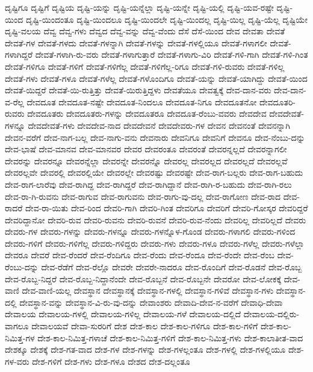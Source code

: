 {ದೃಷ್ಟಿಗೂ
ದೃಷ್ಟಿಗೆ
ದೃಷ್ಟಿಯ
ದೃಷ್ಟಿ-ಯನ್ನು
ದೃಷ್ಟಿ-ಯನ್ನೆಲ್ಲಾ
ದೃಷ್ಟಿ-ಯನ್ನೇ
ದೃಷ್ಟಿ-ಯಲ್ಲಿ
ದೃಷ್ಟಿ-ಯವ-ರಷ್ಟೇ
ದೃಷ್ಟಿ-ಯಿಂದ
ದೃಷ್ಟಿ-ಯಿಂದಂತೂ
ದೃಷ್ಟಿ-ಯಿಂದಲೂ
ದೃಷ್ಟಿ-ಯಿಂದಲೇ
ದೃಷ್ಟಿ-ಯಿಂದಲ್ಲ
ದೃಷ್ಟಿ-ಯಿಲ್ಲ
ದೃಷ್ಟಿ-ಯೆಲ್ಲ
ದೃಷ್ಟಿಯೇ
ದೃಷ್ಟಿ-ವಲಯ
ದೆವ್ವ
ದೆವ್ವ-ಗಳು
ದೆವ್ವದ
ದೆವ್ವ-ವನ್ನು
ದೆವ್ವ-ವೆಂದು
ದೆಸೆ
ದೆಸೆ-ಯಿಂದ
ದೇವ
ದೇವತಾ
ದೇವತೆ
ದೇವತೆ-ಗಳ
ದೇವತೆ-ಗಳದು
ದೇವತೆ-ಗಳನ್ನಾಗಿ
ದೇವತೆ-ಗಳನ್ನು
ದೇವತೆ-ಗಳಲ್ಲಿಯೂ
ದೇವತೆ-ಗಳಾಗಲೀ
ದೇವತೆ-ಗಳಾಗಿದ್ದರೆ
ದೇವತೆ-ಗಳಾಗಿ-ರು-ವರು
ದೇವತೆ-ಗಳಾಗುತ್ತಾರೆ
ದೇವತೆ-ಗಳಾಗು-ವಿರಿ
ದೇವತೆ-ಗಳಿ-ಗಾಗಿ
ದೇವತೆ-ಗಳಿ-ಗಿಂತ
ದೇವತೆ-ಗಳಿಗೂ
ದೇವತೆ-ಗಳಿಗೆ
ದೇವತೆ-ಗಳಿಗೆಲ್ಲ
ದೇವತೆ-ಗಳಿಗೆಲ್ಲ-ರಿಗೂ
ದೇವತೆ-ಗಳಿ-ರುವರು
ದೇವತೆ-ಗಳಿಲ್ಲ
ದೇವತೆ-ಗಳು
ದೇವತೆ-ಗಳೂ
ದೇವತೆ-ಗಳೆಲ್ಲ
ದೇವತೆ-ಗಳೊಂದಿಗೂ
ದೇವತೆ-ಯನ್ನು
ದೇವತೆ-ಯಾಗಿದ್ದು
ದೇವತೆ-ಯಿಂದ
ದೇವತೆ-ಯಿದ್ದರೆ
ದೇವತೆ-ಯಿ-ರುತ್ತಿತ್ತು
ದೇವತೆ-ಯಿರುತ್ತಿದ್ದಳು
ದೇವತೆಯೂ
ದೇವತ್ವಕ್ಕೆ
ದೇವ-ದಾನ-ವರು
ದೇವ-ದಾನ-ವ-ರೆಲ್ಲ
ದೇವದೂತ
ದೇವದೂತ-ನಷ್ಟೇ
ದೇವದೂತ-ನಿಂದಲೂ
ದೇವದೂತ-ನಿಗೂ
ದೇವದೂತನೋ
ದೇವದೂತರಿ-ರುವರು
ದೇವದೂತರು
ದೇವದೂತರು-ಗಳನ್ನು
ದೇವದೂತರೂ
ದೇವದೂತ-ರೆಂಬು-ವವರು
ದೇವದೇವ
ದೇವದೇವತೆ-ಗಳನ್ನೂ
ದೇವದೇವತೆ-ಗಳು
ದೇವದೇವ-ನಾದ
ದೇವದೇವನೆ
ದೇವದೇವರು-ಗಳ
ದೇವನ
ದೇವನಂತೆ
ದೇವನನ್ನಾಗಿ
ದೇವನ-ವರೆಗೆ
ದೇವ-ನಾಗ-ಬಲ್ಲ
ದೇವ-ನಾಗು-ವನು
ದೇವನಾರು
ದೇವನಿಗೂ
ದೇವನಿಗೆ
ದೇವನೂ
ದೇವ-ನೆಂಬು-ದನ್ನು
ದೇವ-ಭಾಷೆ
ದೇವ-ಮಾನವ
ದೇವ-ಮಾನವರ
ದೇವರ
ದೇವರಂತೂ
ದೇವರಂತೆ
ದೇವರನ್ನಲ್ಲದೆ
ದೇವರನ್ನಾಗಲೀ
ದೇವರನ್ನು
ದೇವರನ್ನೂ
ದೇವರನ್ನೆಲ್ಲಾ
ದೇವರನ್ನೇ
ದೇವರನ್ನೊ
ದೇವರಲ್ಲ
ದೇವರಲ್ಲದ
ದೇವರಲ್ಲದೆ
ದೇವರಲ್ಲವೆ
ದೇವರಲ್ಲವೇ
ದೇವರಲ್ಲಿ
ದೇವರಲ್ಲಿಯೇ
ದೇವರಲ್ಲೇ
ದೇವರಷ್ಟು
ದೇವರಷ್ಟೇ
ದೇವ-ರಾಗ-ಬಲ್ಲರು
ದೇವ-ರಾಗ-ಬಹುದು
ದೇವ-ರಾಗ-ಲಾರೆವು
ದೇವ-ರಾಗಿದ್ದ
ದೇವ-ರಾಗಿದ್ದರೆ
ದೇವ-ರಾಗಿದ್ದಾನೆ
ದೇವ-ರಾಗಿ-ರ-ಬಹುದು
ದೇವ-ರಾಗಿ-ರಲು
ದೇವ-ರಾ-ಗಿ-ರುವನು
ದೇವ-ರಾಗುವ
ದೇವ-ರಾಗುವನು
ದೇವ-ರಾಗು-ವು-ದಲ್ಲ
ದೇವ-ರಾಗೋಣ
ದೇವ-ರಾದ
ದೇವ-ರಾದರೆ
ದೇವ-ರಾ-ಯಿತು
ದೇವ-ರಿಂದ
ದೇವರಿ-ಗಾಗಿ
ದೇವರಿ-ಗಿಂತ
ದೇವರಿಗೂ
ದೇವರಿಗೆ
ದೇವರಿ-ಗೋಸ್ಕರ
ದೇವರಿದ್ದರೆ
ದೇವರಿದ್ದಾನೋ
ದೇವರಿ-ರುವ
ದೇವರಿ-ರುವನು
ದೇವರಿ-ರುವನೆ
ದೇವರಿ-ರುವ-ನೆಂದು
ದೇವರಿಲ್ಲ
ದೇವರಿಲ್ಲದೆ
ದೇವರು
ದೇವರು-ಗಳ
ದೇವರು-ಗಳನ್ನು
ದೇವರು-ಗಳನ್ನೂ
ದೇವರು-ಗಳನ್ನೊಳ-ಗೊಂಡ
ದೇವರು-ಗಳಾಗಲಿ
ದೇವರು-ಗಳಿಂದ
ದೇವರು-ಗಳಿಗೆ
ದೇವರು-ಗಳಿಗೆಲ್ಲ
ದೇವರು-ಗಳಿದ್ದರು
ದೇವರು-ಗಳು
ದೇವರು-ಗಳೂ
ದೇವರು-ಗಳೆಲ್ಲ
ದೇವರು-ಗಳೆಲ್ಲಾ
ದೇವರೂ
ದೇವರೆ
ದೇವ-ರೆಂದರೆ
ದೇವ-ರೆಂದಿಗೂ
ದೇವ-ರೆಂದು
ದೇವ-ರೆಂದೂ
ದೇವ-ರೆಂದೇ
ದೇವ-ರೆಂಬ
ದೇವ-ರೆಂಬು-ದನ್ನು
ದೇವ-ರೆಡೆಗೆ
ದೇವ-ರೆಲ್ಲೊ
ದೇವರೇ
ದೇವರೇ-ನಾದರೂ
ದೇವ-ರೊಂದಿಗೆ
ದೇವ-ರೊಡನೆ
ದೇವ-ರೊಬ್ಬ
ದೇವ-ರೊಬ್ಬ-ನಿದ್ದರೆ
ದೇವ-ರೊಬ್ಬ-ನಿದ್ದಾನೆಂದೇ
ದೇವ-ರೊಬ್ಬನೆ
ದೇವ-ರೊಬ್ಬನೇ
ದೇವರೋ
ದೇವ-ಲೋಕಕ್ಕೆ
ದೇವ-ವಾಣಿ
ದೇವ-ವಾಣಿ-ಯಲ್ಲ
ದೇವಸ್ಥಾನ
ದೇವಸ್ಥಾನಕ್ಕೆ
ದೇವಸ್ಥಾನ-ಗಳಲ್ಲಿ
ದೇವಸ್ಥಾನ-ಗಳಿವೆ
ದೇವಸ್ಥಾನ-ಗಳು
ದೇವಸ್ಥಾನ-ದಲ್ಲಿ
ದೇವಸ್ಥಾನ-ವನ್ನು
ದೇವಸ್ಥಾನ-ವಿ-ರು-ವು-ದನ್ನು
ದೇವಾಂಶರು
ದೇವಾದಿ-ದೇವ-ನ-ವರೆಗೆ
ದೇವಾಧಿ-ದೇವಾ
ದೇವಾಲಯ
ದೇವಾಲಯ-ಗಳಲ್ಲಿ
ದೇವಾಲಯ-ಗಳಿಲ್ಲ
ದೇವಾಲಯ-ಗಳೆ
ದೇವಾಲಯ-ದಲ್ಲಿದೆ
ದೇವಾಲಯ-ದಲ್ಲಿರು-ವಾಗಲೂ
ದೇವಾಲಯವೆ
ದೇವಾ-ಸುರರಿಗೆ
ದೇಶ
ದೇಶ-ಕಾಲ
ದೇಶ-ಕಾಲ-ಗಳಿಗೂ
ದೇಶ-ಕಾಲ-ಗಳಿಗೆ
ದೇಶ-ಕಾಲ-ನಿಮಿತ್ತ-ಗಳ
ದೇಶ-ಕಾಲ-ನಿಮಿತ್ತ-ಗಳಾಚೆ
ದೇಶ-ಕಾಲ-ನಿಮಿತ್ತ-ಗಳಿಗೆ
ದೇಶ-ಕಾಲ-ನಿಮಿತ್ತ-ಗಳು
ದೇಶ-ಕಾಲಾತೀತ-ವಾದ
ದೇಶಕ್ಕೂ
ದೇಶಕ್ಕೆ
ದೇಶ-ಗತ-ವಾದ
ದೇಶ-ಗಳ
ದೇಶ-ಗಳನ್ನು
ದೇಶ-ಗಳಲ್ಲಂತೂ
ದೇಶ-ಗಳಲ್ಲಿ
ದೇಶ-ಗಳಲ್ಲಿಯೂ
ದೇಶ-ಗಳ-ವರು
ದೇಶ-ಗಳಿಗೆ
ದೇಶ-ಗಳು
ದೇಶ-ಗಳೂ
ದೇಶದ
ದೇಶ-ದಲ್ಲಂತೂ
}

